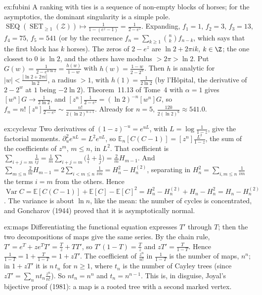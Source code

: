 \begin{solution}{ex:fubini}
\idea A ranking with ties is a sequence of non-empty blocks of horses; for the asymptotics, the dominant singularity is a simple
pole.
\writeup $\operatorname{SEQ}(\operatorname{SET}_{\ge1}(\mathcal Z))\mapsto\frac1{1-(e^z-1)}=\frac1{2-e^z}$. Expanding, $f_1=1$, $f_2=3$, $f_3=13$, $f_4=75$, $f_5=541$ (or by the recurrence $f_n=\sum_{k\ge1}\binom nkf_{n-k}$, which
says that the first block has $k$ horses). The zeros of $2-e^z$ are $\ln2+2\pi ik$, $k\in\Z$; the one closest to $0$ is $\ln2$, and the others have modulus
$>2\pi>\ln 2$. Put $G(w)=\frac1{2-e^{w\ln2}}=\frac{h(w)}{1-w}$ with $h(w)=\frac{1-w}{2-2^w}$. Then $h$ is analytic for $|w|<\frac{|\ln2+2\pi i|}{\ln2}$, a radius $>1$, with $h(1)=\frac1{2\ln2}$
(by l'H\^opital, the derivative of $2-2^w$ at $1$ being $-2\ln2$). Theorem~11.13 of Tome~4 with $\alpha=1$ gives $[w^n]G\to\frac1{2\ln2}$, and $[z^n]\frac1{2-e^z}=(\ln2)^{-n}[w^n]G$, so
$f_n=n!\,[z^n]\frac1{2-e^z}\sim\frac{n!}{2(\ln2)^{n+1}}$. Already for $n=5$, $\frac{120}{2(\ln2)^6}\approx541.0$.
\end{solution}

\begin{solution}{ex:cyclevar}
\idea Two derivatives of $(1-z)^{-u}=e^{uL}$, with $L=\log\frac1{1-z}$, give the factorial moments.
\writeup $\partial_u^2e^{uL}=L^2e^{uL}$, so $\mathbb E_n[C(C-1)]=[z^n]\frac{L^2}{1-z}$, the sum of the coefficients of $z^m$, $m\le n$, in $L^2$. That coefficient is
$\sum_{i+j=m}\frac1{ij}=\frac1m\sum_{i+j=m}\big(\frac1i+\frac1j\big)=\frac2mH_{m-1}$. And $\sum_{m\le n}\frac2mH_{m-1}=2\sum_{i<m\le n}\frac1{im}=H_n^2-H_n^{(2)}$, separating in $H_n^2=\sum_{i,m\le n}\frac1{im}$ the
terms $i=m$ from the others. Hence $\operatorname{Var}C=\mathbb E[C(C-1)]+\mathbb E[C]-\mathbb E[C]^2=H_n^2-H_n^{(2)}+H_n-H_n^2=H_n-H_n^{(2)}$.
The variance is about $\ln n$, like the mean: the number of cycles is concentrated, and Goncharov (1944) proved that it is asymptotically
normal.
\end{solution}

\begin{solution}{ex:maps}
\idea Differentiating the functional equation expresses $T'$ through $T$; then the two decompositions of maps give the same series.
\writeup By the chain rule, $T'=e^T+ze^TT'=\frac Tz+TT'$, so $T'(1-T)=\frac Tz$ and $zT'=\frac T{1-T}$. Hence $\frac1{1-T}=1+\frac T{1-T}=1+zT'$. The coefficient of $\frac{z^n}{n!}$ in
$\frac1{1-T}$ is the number of maps, $n^n$; in $1+zT'$ it is $n\,t_n$ for $n\ge1$, where $t_n$ is the number of Cayley trees (since $zT'=\sum_nnt_n\frac{z^n}{n!}$). So $nt_n=n^n$ and
$t_n=n^{n-1}$. This is, in disguise, Joyal's bijective proof (1981): a map is a rooted tree with a second marked vertex.
\end{solution}

